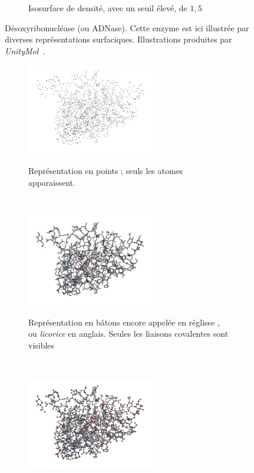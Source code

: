 \begin{figure}[H]
\begin{subfigure}[t]{\subImgW}
            \caption{Isosurface de densité, avec un seuil élevé, de $1,5$}
            \label{fig:4awn_iso_1_5}
        \end{subfigure}
        \caption{Désoxyribonucléase (ou ADNase). Cette enzyme est ici illustrée par diverses représentations surfaciques. Illustrations produites par \emph{UnityMol}~\cite{doutreligne2014unitymol}.}
        \label{fig:4awn_surf}
    \end{figure}
    
    \begin{figure}[H]
        \begin{subfigure}[t]{\subImgW}
            \centering
            {\includegraphics[height=4cm]{./figures/ch1/4awn_points}}
            \caption{Représentation en \og points \fg{} ; seuls les atomes apparaissent.}
            \label{fig:4awn_points}
        \end{subfigure}
        ~
        \begin{subfigure}[t]{\subImgW}
            \centering
            {\includegraphics[height=4cm]{./figures/ch1/4awn_licorice}}
            \caption{Représentation en \og bâtons \fg{} encore appelée en \og réglisse \fg{}, ou \emph{licorice} en anglais. Seules les liaisons covalentes sont visibles}
            \label{fig:4awn_licorice}
        \end{subfigure}
        ~
        \begin{subfigure}[t]{\subImgW}
            \centering
            {\includegraphics[height=4cm]{./figures/ch1/4awn_CPK}}

\end{subfigure}
\end{figure}
